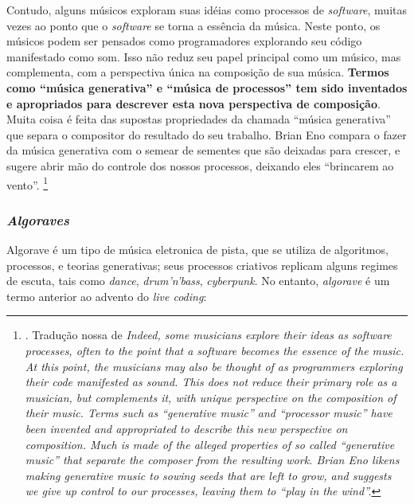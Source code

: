 \begin{citacao}
Contudo, alguns músicos exploram suas idéias como processos de \emph{software}, muitas vezes ao ponto que o \emph{software} se torna a essência da música. Neste ponto, os músicos podem ser pensados como programadores explorando seu código manifestado como som. Isso não reduz seu papel principal como um músico, mas complementa, com a perspectiva única na composição de sua música. \textbf{Termos como ``música generativa'' e ``música de processos'' tem sido inventados e apropriados para descrever esta nova perspectiva de composição}. Muita coisa é feita das supostas propriedades da chamada ``música generativa'' que separa o compositor do resultado do seu trabalho. Brian Eno compara o fazer da música generativa com o semear de sementes que são deixadas para crescer, e sugere abrir mão do controle dos nossos processos, deixando eles ``brincarem ao vento''. \footnote{. Tradução nossa de \emph{Indeed, some musicians explore their ideas as software processes, often to the point that a software becomes the essence of the music. At this point, the musicians may also be thought of as programmers exploring their code manifested as sound. This does not reduce their primary role as a musician, but complements it, with unique perspective on the composition of their music. Terms such as “generative music” and “processor music” have been invented and appropriated to describe this new perspective on composition. Much is made of the alleged properties of so called “generative music” that separate the composer from the resulting work. Brian Eno likens making generative music to sowing seeds that are left to grow, and suggests we give up control to our processes, leaving them to “play in the wind”.}}
\end{citacao}

\subsubsection{\emph{Algoraves}}\label{sec:algorave}

Algorave é  um tipo de música eletronica de pista, que se utiliza de algoritmos, processos, e teorias generativas; seus processos criativos replicam alguns regimes de escuta, tais como \emph{dance}, \emph{drum'n'bass}, \emph{cyberpunk}. No entanto, \emph{algorave} é um termo anterior ao advento do \emph{live coding}: 

